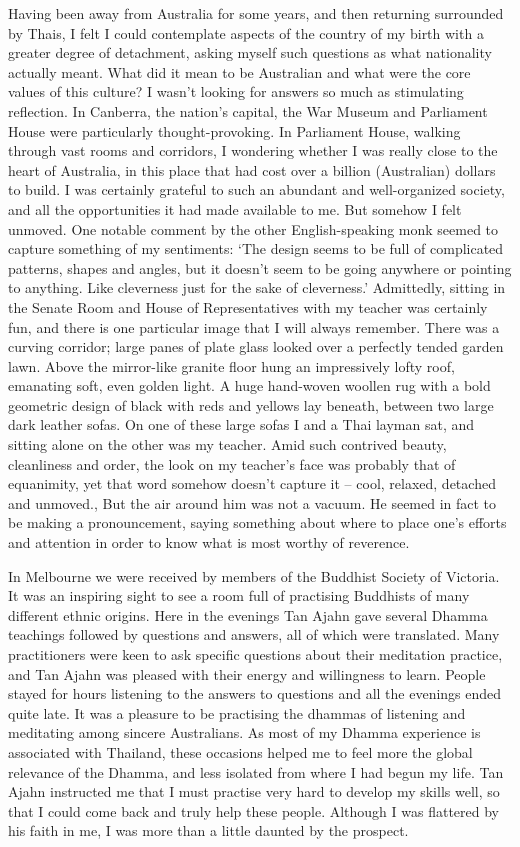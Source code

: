 Having been away from Australia for some years, and then returning
surrounded by Thais, I felt I could contemplate aspects of the country
of my birth with a greater degree of detachment, asking myself such
questions as what nationality actually meant. What did it mean to be
Australian and what were the core values of this culture? I wasn't
looking for answers so much as stimulating reflection. In Canberra, the
nation's capital, the War Museum and Parliament House were particularly
thought-provoking. In Parliament House, walking through vast rooms and
corridors, I wondering whether I was really close to the heart of
Australia, in this place that had cost over a billion (Australian)
dollars to build. I was certainly grateful to such an abundant and
well-organized society, and all the opportunities it had made available
to me. But somehow I felt unmoved. One notable comment by the other
English-speaking monk seemed to capture something of my sentiments: `The
design seems to be full of complicated patterns, shapes and angles, but
it doesn't seem to be going anywhere or pointing to anything. Like
cleverness just for the sake of cleverness.' Admittedly, sitting in the
Senate Room and House of Representatives with my teacher was certainly
fun, and there is one particular image that I will always remember.
There was a curving corridor; large panes of plate glass looked over a
perfectly tended garden lawn. Above the mirror-like granite floor hung
an impressively lofty roof, emanating soft, even golden light. A huge
hand-woven woollen rug with a bold geometric design of black with reds
and yellows lay beneath, between two large dark leather sofas. On one of
these large sofas I and a Thai layman sat, and sitting alone on the
other was my teacher. Amid such contrived beauty, cleanliness and order,
the look on my teacher's face was probably that of equanimity, yet that
word somehow doesn't capture it -- cool, relaxed, detached and unmoved.,
But the air around him was not a vacuum. He seemed in fact to be making
a pronouncement, saying something about where to place one's efforts and
attention in order to know what is most worthy of reverence.

In Melbourne we were received by members of the Buddhist Society of
Victoria. It was an inspiring sight to see a room full of practising
Buddhists of many different ethnic origins. Here in the evenings Tan
Ajahn gave several Dhamma teachings followed by questions and answers,
all of which were translated. Many practitioners were keen to ask
specific questions about their meditation practice, and Tan Ajahn was
pleased with their energy and willingness to learn. People stayed for
hours listening to the answers to questions and all the evenings ended
quite late. It was a pleasure to be practising the dhammas of listening
and meditating among sincere Australians. As most of my Dhamma
experience is associated with Thailand, these occasions helped me to
feel more the global relevance of the Dhamma, and less isolated from
where I had begun my life. Tan Ajahn instructed me that I must practise
very hard to develop my skills well, so that I could come back and truly
help these people. Although I was flattered by his faith in me, I was
more than a little daunted by the prospect.

